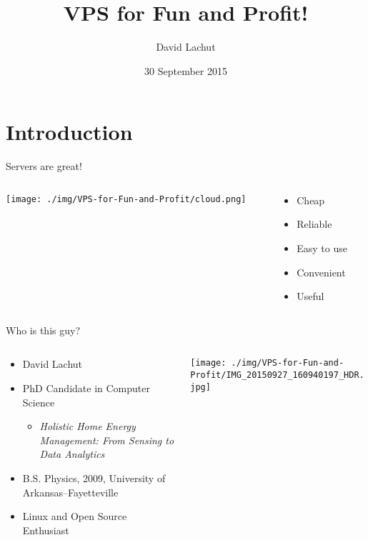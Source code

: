 \documentclass[presentation,aspectratio=169]{beamer}
\author{David Lachut}
\date{30 September 2015}
\title{VPS for Fun and Profit!}
\begin{document}
\maketitle

\section{Introduction}
\label{sec-1}
\begin{frame}[label=sec-1-0-1]{Servers are great!}
\begin{columns}
\begin{column}{0.45\textwidth}

\texttt{[image: ./img/VPS-for-Fun-and-Profit/cloud.png]}
\end{column}

\begin{column}{0.45\textwidth}

\begin{itemize}
\item Cheap
\item Reliable
\item Easy to use
\item Convenient
\item Useful
\end{itemize}
\end{column}
\end{columns}
\end{frame}

\begin{frame}[label=sec-1-0-2]{Who is this guy?}
\begin{columns}
\begin{column}{0.45\textwidth}

\begin{itemize}
\item David Lachut
\item PhD Candidate in Computer Science
\begin{itemize}
\item \emph{Holistic Home Energy Management: From Sensing to Data Analytics}
\end{itemize}
\item B.S. Physics, 2009, University of Arkansas--Fayetteville
\item Linux and Open Source Enthusiast
\end{itemize}
\end{column}

\begin{column}{0.45\textwidth}

\texttt{[image: ./img/VPS-for-Fun-and-Profit/IMG\_20150927\_160940197\_HDR.jpg]}
\end{column}
\end{columns}
\end{frame}
\end{document}
